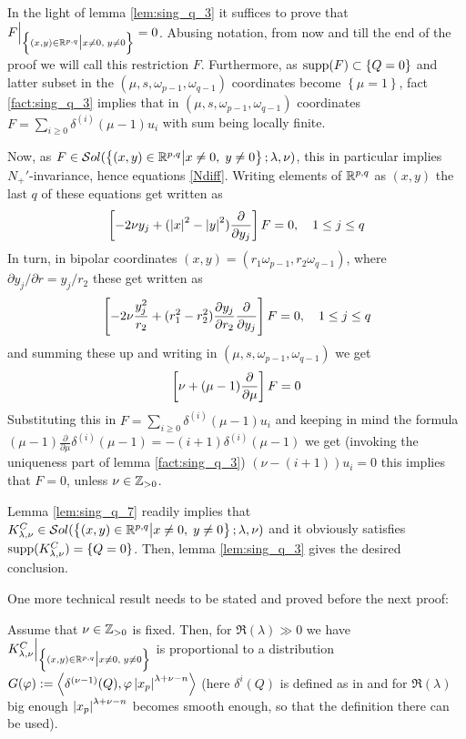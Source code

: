 \documentclass[10pt]{article} %
\theoremstyle{definition}
\theoremstyle{remark}
\begin{document}
\begin{myproof}
	In the light of lemma \ref{lem:sing_q_3} it suffices to prove that $F\Big|_{\mysetn{(x,y)\in\R^{p,q}}{x\neq0,\;y\neq0}}=0$.
	Abusing notation, from now and till the end of the proof we will call this restriction $F$.
	Furthermore, as $\supp(F)\subset\left\{ Q=0 \right\}$ and latter subset in the $(\mu,s,\omega_{p-1},\omega_{q-1})$ coordinates
	become $\left\{ \mu=1 \right\}$, fact \ref{fact:sing_q_3}
	implies that in $(\mu,s,\omega_{p-1},\omega_{q-1})$ coordinates 
	$F=\sum_{i\geq0}\delta^{(i)}(\mu-1)u_i$ with sum being locally finite.

	Now, as $F\in\sol[\mysetn{(x,y)\in\R^{p,q}}{x\neq0,\;y\neq0}]$, this in particular
	implies $N_+'$-invariance, hence equations \eqref{Ndiff}. Writing elements of $\R^{p,q}$
	as $(x,y)$ the last $q$ of these equations get written as \[\left[ -2\nu y_j+(\myabs{x}^2-\myabs{y}^2)\frac{\partial}{
	\partial y_j} \right]F=0,\quad1\leq j\leq q\]
	In turn, in bipolar coordinates $(x,y)=(r_1\omega_{p-1},r_2\omega_{q-1})$, where $\partial y_j/\partial r=
	y_j/r_2$ these get written as
	\[\mysbra{-2\nu \frac{y_j^2}{r_2}+(r_1^2-r_2^2)\frac{\partial y_j}{\partial r_2}\frac{\partial}{\partial y_j}}F=0,\quad
	1\leq j\leq q\]
	and summing these up and writing in $(\mu,s,\omega_{p-1},\omega_{q-1})$ we get
	\[\mysbra{\nu+(\mu-1)\frac{\partial}{\partial\mu}}F=0\]
	Substituting this in 
	$F=\sum_{i\geq0}\delta^{(i)}(\mu-1)u_i$ and keeping in mind the formula $(\mu-1)\frac{\partial}{\partial\mu}\delta^{(i)}
	(\mu-1)=-(i+1)\delta^{(i)}(\mu-1)$ we get (invoking the uniqueness part of lemma \ref{fact:sing_q_3})
	$(\nu-(i+1))u_i=0$ this implies that $F=0$, unless $\nu\in\Z_{>0}$.
\end{myproof}
\begin{myproof}
	Lemma \ref{lem:sing_q_7} readily implies that $K^C_{\lambda,\nu}\in\sol[\Upp]$
	and it obviously satisfies $\supp(K^C_{\lambda,\nu})=\left\{ Q=0 \right\}$.
	Then, lemma \ref{lem:sing_q_3} gives the desired conclusion.
\end{myproof}
One more technical result needs to be stated and proved before the next proof:
\begin{mylem}
	\label{lem:sing_q_8}
	Assume that $\nu\in\Z_{>0}$ is fixed. Then, for $\Re(\lambda)\gg0$ we have
	$K_{\lambda,\nu}^C\Big|_{\Upp}$ is proportional to a distribution
	$G(\varphi):=\myabra{\delta^{(\nu-1)}(Q),\varphi\myabs{x_p}^{\lambda+\nu-n}}$
	(here $\delta^{i}(Q)$ is defined as in
	\cite[ch. III, sec. 2.1]{gelfand1980distribution} and for $\Re(\lambda)$ big enough $\myabs{x_p}^{\lambda+\nu-n}$ becomes
	smooth enough, so that the definition there can be used).
\end{mylem}
\end{document}
